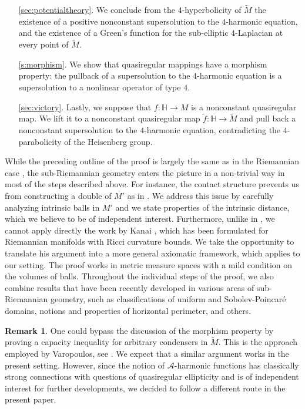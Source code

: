\documentclass[10pt,letterpaper]{amsart}
\theoremstyle{definition}
\newtheorem{remark}[thm]{Remark}
\numberwithin{thm}{subsection}
\numberwithin{equation}{section}
\begin{document}
\begin{enumerate}
\item[\ref{sec:potentialtheory}.] We conclude from the
$4$-hyperbolicity of $\widetilde M$ the existence of a positive
nonconstant supersolution to the $4$-harmonic equation, and
the existence of a Green's function for the sub-elliptic $4$-Laplacian at every
point of $\widetilde M$. \item[\ref{s:morphism}.] We show that quasiregular mappings have a morphism
property: the pullback of a supersolution to the $4$-harmonic equation is
a supersolution to a nonlinear operator of type $4$.
\item[\ref{sec:victory}.] Lastly, we suppose that $f: {\mathbb H}
\rightarrow M$ is a nonconstant quasiregular map. We lift it to a
nonconstant quasiregular map $\widetilde{f}: {\mathbb H} \rightarrow
\widetilde M$ and pull back a nonconstant supersolution to the
$4$-harmonic equation, contradicting the $4$-parabolicity of the
Heisenberg group.
\end{enumerate}

While the preceding outline of the proof is largely the same as in the Riemannian case \cite{MR2832708}, the sub-Riemannian geometry enters the picture in a non-trivial way in most of the steps described above. For instance, the contact structure prevents us from constructing a  {double} of $\overline{M'}$ as in \cite{MR2832708}. We address this issue by carefully analyzing intrinsic balls in $M'$ and we state properties of the intrinsic distance, which we believe to be of independent interest. Furthermore, unlike in \cite{MR2832708}, we cannot apply directly the work by Kanai \cite{MR792983}, which has been formulated for Riemannian manifolds with Ricci curvature bounds. We take the opportunity to translate his argument into a more general axiomatic framework, which applies to our setting. The proof works in metric measure spaces with a mild condition on the volumes of balls. Throughout the individual steps of the proof, we also combine results that have been recently developed in various areas of sub-Riemannian geometry, such as classifications of uniform and Sobolev-Poincar\'{e} domains, notions and properties of horizontal perimeter, and others.

\begin{remark}
One could bypass the discussion of the morphism property by proving a capacity inequality for arbitrary condensers in $\widetilde{M}$. This is the approach employed by Varopoulos, see \cite[Chapter X]{MR1218884}. We expect that a similar argument works in the present setting.
However, since the notion of $\mathcal{A}$-harmonic functions has
classically strong connections with questions of quasiregular
ellipticity and is of independent interest for further
developments, we decided to follow a different route in the
present paper.
\end{remark}
\end{document}

